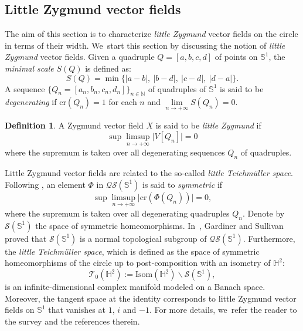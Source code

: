 \documentclass[11pt]{article}
\theoremstyle{plain}
\theoremstyle{definition}
\newtheorem{defi}[cor]{Definition}
\begin{document}
\subsection{Little Zygmund vector fields}
The aim of this section is to characterize \emph{little Zygmund} vector fields on the circle in terms of their width. We~start this section by discussing the notion of \emph{little Zygmund} vector fields. Given a quadruple $Q=[a,b,c,d]$ of points on $\mathbb{S}^1$, the \emph{minimal scale} $S(Q)$ is defined as:
\[
S(Q)=\min\{\lvert a-b\rvert, \ \lvert b-d\rvert,\ \lvert c-d\rvert, \ \lvert d-a\rvert \}.
\]
A sequence $ \{Q_n = [a_n, b_n, c_n, d_n]\}_{n\in\mathbb{N}}$ of quadruples of $\mathbb{S}^1$ is said to be \emph{degenerating} if $\mathrm{cr}(Q_n)=1$ for each $n$ and $\lim\limits_{n \rightarrow +\infty} S(Q_n)=0$.
\begin{defi}
A Zygmund vector field $X$ is said to be \emph{little Zygmund} if
\[
\sup\limsup\limits_{n \rightarrow +\infty} \lvert V[Q_n]\rvert=0
\]
where the supremum is taken over all degenerating sequences $Q_n$ of quadruples.
\end{defi}
Little Zygmund vector fields are related to the so-called \emph{little Teichmüller space}. Following \cite{Fan_Hu_Little}, an element $\Phi$ in $\mathcal{QS}(\mathbb{S}^1)$ is said to \emph{symmetric} if
\[
\sup\limsup\limits_{n \rightarrow +\infty} \lvert \mathrm{cr}(\Phi(Q_n))\rvert=0,
\]
where the supremum is taken over all degenerating quadruples $Q_n$. Denote by $\mathcal{S}(\mathbb{S}^1)$ the space of symmetric homeomorphisms. In~\cite{Gardiner_Sullivan}, Gardiner and Sullivan proved that $\mathcal{S}(\mathbb{S}^1)$ is a normal topological subgroup of $\mathcal{QS}(\mathbb{S}^1)$. Furthermore, the \emph{little Teichmüller space}, which is defined as the space of symmetric homeomorphisms of the circle up to post-composition with an isometry of $\mathbb{H}^2$:
\[
\mathcal{T}_0(\mathbb{H}^2):=\mathrm{Isom}(\mathbb{H}^2)\backslash \mathcal{S}(\mathbb{S}^1),
\]
is an infinite-dimensional complex manifold modeled on a Banach space. Moreover, the tangent space at the identity corresponds to little Zygmund vector fields on $\mathbb{S}^1$ that vanishes at $1$, $i$ and $-1$. For more details, we~refer the reader to the survey \cite{HU_Survey} and the references therein.
\end{document}
